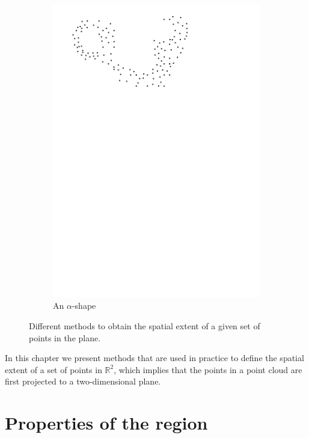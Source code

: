 \begin{figure}
\begin{subfigure}[b]{0.4\linewidth}
    \includegraphics[page=4,width=\textwidth]{figs/idea.pdf}
    \caption{An $\alpha$-shape}
  \end{subfigure}
\caption{Different methods to obtain the spatial extent of a given set of points in the plane.}%
\end{figure}

%

In this chapter we present methods that are used in practice to define the spatial extent of a set of points in $\mathbb{R}^2$, which implies that the points in a point cloud are first projected to a two-dimensional plane.



%
\section{Properties of the region}%
\label{sec:properties}

